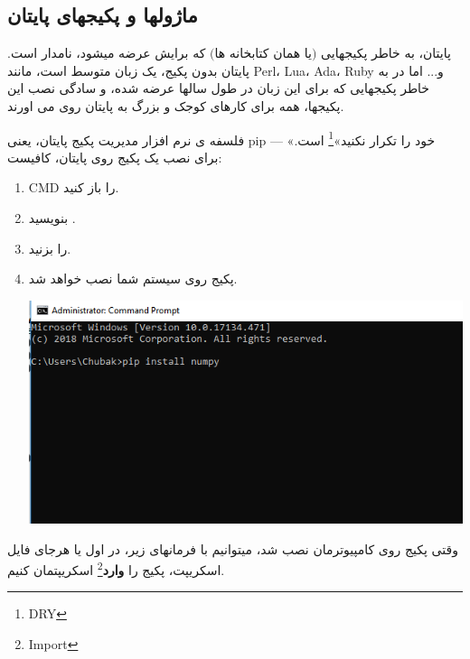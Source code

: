 \documentclass[14pt,a4paper]{memoir}
\begin{document}
	 
	 
	 \subsection{ماژولها و پکیجهای پایتان}\label{pip}
	 
	 پایتان، به خاطر پکیجهایی $ \text{(یا همان کتابخانه ها)} $ که برایش عرضه میشود، نامدار است.
	 پایتان بدون پکیج، یک زبان متوسط است، مانند Perl، Lua، Ada، Ruby و... اما در به خاطر پکیجهایی که برای این زبان در طول سالها عرضه شده، و سادگی نصب این پکیجها، همه برای کارهای کوجک و بزرگ  به پایتان روی می اورند.
	 
	 فلسفه ی نرم افزار مدیریت پکیج پایتان، یعنی pip --- «خود را تکرار نکنید»\footnote{DRY} است. برای نصب یک پکیج روی پایتان، کافیست:
	 
	 \begin{enumerate}
	 	\item CMD را باز کنید.
	 	\item بنویسید .
	 	\item \keys{\return} را بزنید.
	 	\item پکیج روی سیستم شما نصب خواهد شد.
	 	\begin{center}
	 		\includegraphics[scale=0.8]{pip_1}
	 	\end{center}
	 \end{enumerate}  
	 
	 
	 وقتی پکیج روی کامپیوترمان نصب شد، میتوانیم با فرمانهای زیر، در اول یا هرجای فایل اسکریپت، پکیج را \textbf{وارد}\footnote{Import} اسکریپتمان کنیم.
	 
	 
	 
	 	 	 \begin{latin}
	 	
	 \end{latin}
 
\end{document}
